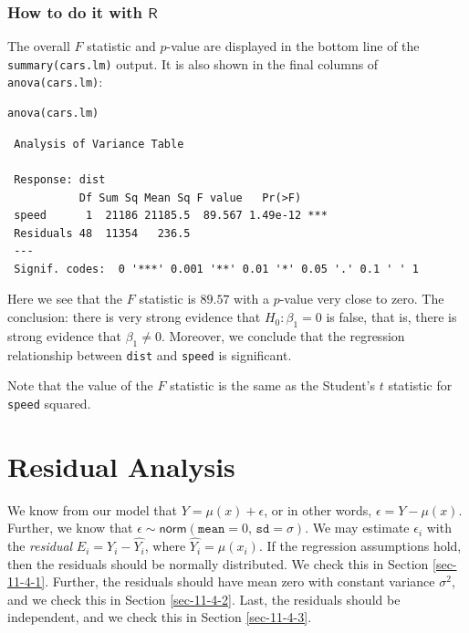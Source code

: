 \documentclass[captions=tableheading]{scrbook}
\begin{document}
\subsubsection{How to do it with \(\mathsf{R}\)}
\label{sec-11-3-3-1}


The overall \(F\) statistic and \(p\)-value are displayed in the bottom line of the \texttt{summary(cars.lm)} output. It is also shown in the final columns of \texttt{anova(cars.lm)}:


\lstset{language=R}
\begin{lstlisting}
anova(cars.lm)
\end{lstlisting}

\begin{verbatim}
 Analysis of Variance Table
 
 Response: dist
           Df Sum Sq Mean Sq F value   Pr(>F)    
 speed      1  21186 21185.5  89.567 1.49e-12 ***
 Residuals 48  11354   236.5                     
 ---
 Signif. codes:  0 '***' 0.001 '**' 0.01 '*' 0.05 '.' 0.1 ' ' 1
\end{verbatim}



Here we see that the \(F\) statistic is \(  89.57 \) with a \(p\)-value very close to zero. The conclusion: there is very strong evidence that \(H_{0}:\beta_{1} = 0 \) is false, that is, there is strong evidence that \( \beta_{1} \neq 0 \). Moreover, we conclude that the regression relationship between \texttt{dist} and \texttt{speed} is significant.

Note that the value of the \(F\) statistic is the same as the Student's \(t\) statistic for \texttt{speed} squared.
\section{Residual Analysis}
\label{sec-11-4}
\label{sec-Residual-Analysis-SLR}


We know from our model that \(Y=\mu(x)+\epsilon\), or in other words, \(\epsilon=Y-\mu(x)\). Further, we know that \(\epsilon\sim\mathsf{norm}(\mathtt{mean}=0,\,\mathtt{sd}=\sigma)\). We may estimate \(\epsilon_{i}\) with the \emph{residual} \(E_{i}=Y_{i}-\hat{Y_{i}}\), where \(\hat{Y_{i}}=\hat{\mu}(x_{i})\). If the regression assumptions hold, then the residuals should be normally distributed. We check this in Section \ref{sec-11-4-1}. Further, the residuals should have mean zero with constant variance \(\sigma^{2}\), and we check this in Section \ref{sec-11-4-2}. Last, the residuals should be independent, and we check this in Section \ref{sec-11-4-3}.
\end{document}
